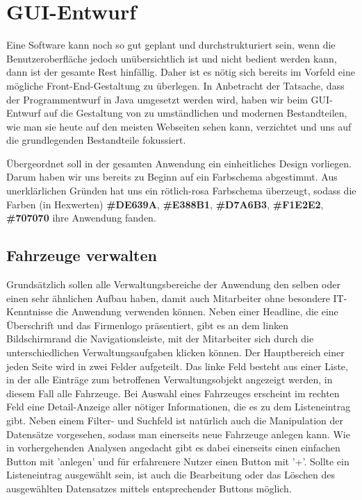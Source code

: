 \chapter{GUI-Entwurf}

Eine Software kann noch so gut geplant und durchstrukturiert sein, wenn die Benutzeroberfläche jedoch unübersichtlich ist und nicht bedient werden kann, dann ist der gesamte Rest hinfällig. Daher ist es nötig sich bereits im Vorfeld eine mögliche Front-End-Gestaltung zu überlegen. In Anbetracht der Tatsache, dass der Programmentwurf in Java umgesetzt werden wird, haben wir beim GUI-Entwurf auf die Gestaltung von zu umständlichen und modernen Bestandteilen, wie man sie heute auf den meisten Webseiten sehen kann, verzichtet und uns auf die grundlegenden Bestandteile fokussiert. 


Übergeordnet soll in der gesamten Anwendung ein einheitliches Design vorliegen. Darum haben wir uns bereits zu Beginn auf ein Farbschema abgestimmt. Aus unerklärlichen Gründen hat uns ein rötlich-rosa Farbschema überzeugt, sodass die Farben (in Hexwerten) \textbf{\#DE639A}, \textbf{\#E388B1}, \textbf{\#D7A6B3}, \textbf{\#F1E2E2}, \textbf{\#707070} ihre Anwendung fanden. 

\section{Fahrzeuge verwalten}

Grundsätzlich sollen alle Verwaltungsbereiche der Anwendung den selben oder einen sehr ähnlichen Aufbau haben, damit auch Mitarbeiter ohne besondere IT-Kenntnisse die Anwendung verwenden können. Neben einer Headline, die eine Überschrift und das Firmenlogo präsentiert, gibt es an dem linken Bildschirmrand die Navigationsleiste, mit der Mitarbeiter sich durch die unterschiedlichen Verwaltungsaufgaben klicken können. Der Hauptbereich einer jeden Seite wird in zwei Felder aufgeteilt. Das linke Feld besteht aus einer Liste, in der alle Einträge zum betroffenen Verwaltungsobjekt angezeigt werden, in diesem Fall alle Fahrzeuge. Bei Auswahl eines Fahrzeuges erscheint im rechten Feld eine Detail-Anzeige aller nötiger Informationen, die es zu dem Listeneintrag gibt. Neben einem Filter- und Suchfeld ist natürlich auch die Manipulation der Datensätze vorgesehen, sodass man einerseits neue Fahrzeuge anlegen kann. Wie in vorhergehenden Analysen angedacht gibt es dabei einerseits einen einfachen Button mit 'anlegen' und für erfahrenere Nutzer einen Button mit '+'. Sollte ein Listeneintrag ausgewählt sein, ist auch die Bearbeitung oder das Löschen des ausgewählten Datensatzes mittels entsprechender Buttons möglich. 

